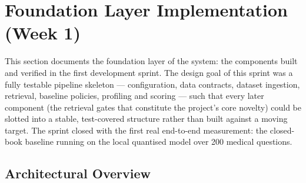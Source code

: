 %


\section{Foundation Layer Implementation (Week 1)}
\label{sec:impl-week1}

This section documents the foundation layer of the system: the components
built and verified in the first development sprint. The design goal of this
sprint was a fully testable pipeline skeleton --- configuration, data
contracts, dataset ingestion, retrieval, baseline policies, profiling and
scoring --- such that every later component (the retrieval gates that
constitute the project's core novelty) could be slotted into a stable,
test-covered structure rather than built against a moving target. The sprint
closed with the first real end-to-end measurement: the closed-book baseline
running on the local quantised model over 200 medical questions.

\subsection{Architectural Overview}
\label{sec:impl-arch}

